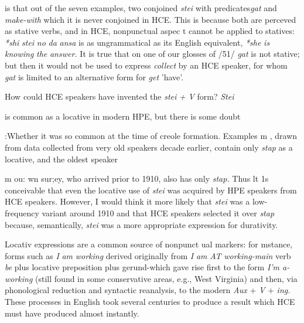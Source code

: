 is that out of the seven examples, two conjoined \textit{stei} with predicates\-\textit{gat} and \textit{make-with} which it is never conjoined in HCE. This is because both are perceved as stative verbs, and in HCE, nonpunctual aspec t cannot be applied to statives: \textit{*shi} \textit{stei} \textit{no} \textit{da} \textit{ansa} is as ungrammatical as its English equivalent, \textit{*she} \textit{is} \textit{knowing} \textit{the} \textit{answer.} It is true that on one of our glosses of /51/ \textit{gat} is not stative; but then it would not be used to express \textit{collect }by an HCE speaker, for whom \textit{gat }is limited to an alternative form for \textit{get }'have'.

How could HCE speakers have invented the \textit{stei} \textit{+} \textit{V} form? \textit{Stei}

is common as a locative in modern HPE, but there is some doubt

:Whether it was so common at the time of creole formation. Examples m \citet{Nagara1972}, drawn from data collected from very old speakers decade earlier, contain only \textit{stap} as a locative, and the oldest speaker

m ou: wn sur;ey, who arrived prior to 1910, also has only \textit{stap.} Thus lt 1s conceivable that even the locative use of \textit{stei} was acquired by HPE speakers from HCE speakers. However, I would think it more likely that \textit{stei} was a low-frequency variant around 1910 and that HCE speakers selected it over \textit{stap} because, semantically, \textit{stei} was a more appropriate expression for durativity.

Locativ expressions are a common source of nonpunct ual markers: for mstance, forms such as \textit{I} \textit{am} \textit{worki}\textit{n}\textit{g} derived originally from \textit{I} \textit{am} \textit{AT} \textit{working-main} verb \textit{be} plus locative preposition plus
gerund-which gave rise first to the form \textit{I'm a-working }(still found in some conservative areas, e.g., West Virginia) and then, via phono\-logical reduction and syntactic reanalysis, to the modern \textit{Aux} + \textit{V} + \textit{i}\textit{n}\textit{g.} These processes in English took several centuries to produce a result which HCE must have produced almost instantly.

